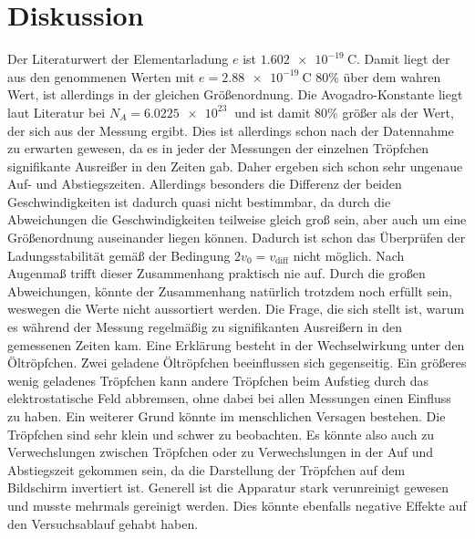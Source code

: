 \section{Diskussion}
Der Literaturwert der Elementarladung $e$ ist $\qty{1.602e-19}{\coulomb}$\cite{PhysikTabellen}. Damit liegt der aus den genommenen Werten 
mit $e=\qty{2.88e-19}{\coulomb}$ 80\% über dem wahren Wert, ist allerdings in der gleichen Größenordnung.
Die Avogadro-Konstante liegt laut Literatur bei $N_A=\qty{6.0225e23}{}$\cite{PhysikTabellen} und ist damit 80\% größer als der Wert, der sich aus der Messung
ergibt. Dies ist allerdings schon nach der Datennahme zu erwarten gewesen, da es in jeder der Messungen der einzelnen Tröpfchen signifikante
Ausreißer in den Zeiten gab. Daher ergeben sich schon sehr ungenaue Auf- und Abstiegszeiten. Allerdings besonders die Differenz der beiden
Geschwindigkeiten ist dadurch quasi nicht bestimmbar, da durch die Abweichungen die Geschwindigkeiten teilweise gleich groß sein, aber auch um eine Größenordnung auseinander liegen können.
Dadurch ist schon das Überprüfen der Ladungsstabilität gemäß der Bedingung $2v_0=v_\text{diff}$ nicht möglich.
Nach Augenmaß trifft dieser Zusammenhang praktisch nie auf. Durch die großen Abweichungen, könnte der Zusammenhang natürlich trotzdem 
noch erfüllt sein, weswegen die Werte nicht aussortiert werden. Die Frage, die sich stellt ist, warum es während der Messung regelmäßig zu signifikanten
Ausreißern in den gemessenen Zeiten kam. Eine Erklärung besteht in der Wechselwirkung unter den Öltröpfchen. Zwei geladene Öltröpfchen
beeinflussen sich gegenseitig. Ein größeres wenig geladenes Tröpfchen kann andere Tröpfchen beim Aufstieg durch das elektrostatische Feld abbremsen,
ohne dabei bei allen Messungen einen Einfluss zu haben. Ein weiterer Grund könnte im menschlichen Versagen bestehen. Die Tröpfchen sind sehr klein und schwer zu beobachten.
Es könnte also auch zu Verwechslungen zwischen Tröpfchen oder zu Verwechslungen in der Auf und Abstiegszeit gekommen sein, da die Darstellung der
Tröpfchen auf dem Bildschirm invertiert ist. Generell ist die Apparatur stark verunreinigt gewesen und musste mehrmals gereinigt werden. Dies könnte ebenfalls
negative Effekte auf den Versuchsablauf gehabt haben.
\label{sec:Diskussion}
